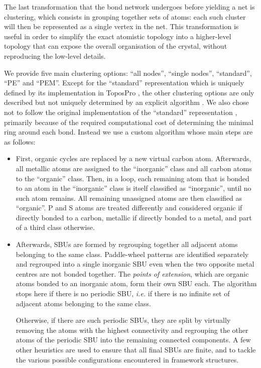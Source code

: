 \documentclass[main.tex]{subfiles}
\begin{document}
The last transformation that the bond network undergoes before yielding a net is clustering, which consists in grouping together sets of atoms: each such cluster will then be represented as a single vertex in the net. This transformation is useful in order to simplify the exact atomistic topology into a higher-level topology that can expose the overall organisation of the crystal, without reproducing the low-level details. %

We provide five main clustering options: ``all nodes'', ``single nodes'', ``standard'', ``PE'' and ``PEM''. Except for the ``standard'' representation which is uniquely defined by its implementation in ToposPro \autocite{BlatovSimplify,BlatovCSD}, the other clustering options are only described but not uniquely determined by an explicit algorithm \autocite{IUPAC_SBU,OKeeffeSBU,OKeeffe,BlatovSimplify,MetalOxo,ProserpioPEM}. We also chose not to follow the original implementation of the ``standard'' representation \autocite{BlatovCSD}, primarily because of the required computational cost of determining the minimal ring around each bond. Instead we use a custom algorithm whose main steps are as follows:
\begin{itemize}
	\item First, organic cycles are replaced by a new virtual carbon atom. Afterwards, all metallic atoms are assigned to the ``inorganic'' class and all carbon atoms to the ``organic'' class. Then, in a loop, each remaining atom that is bonded to an atom in the ``inorganic'' class is itself classified as ``inorganic'', until no such atom remains. All remaining unassigned atoms are then classified as ``organic''. P and S atoms are treated differently and considered organic if directly bonded to a carbon, metallic if directly bonded to a metal, and part of a third class otherwise.
	
	\item Afterwards, SBUs are formed by regrouping together all adjacent atoms belonging to the same class. Paddle-wheel patterns are identified separately and regrouped into a single inorganic SBU even when the two opposite metal centres are not bonded together. The \textit{points of extension}, which are organic atoms bonded to an inorganic atom, form their own SBU each. The algorithm stops here if there is no periodic SBU, \textit{i.e.} if there is no infinite set of adjacent atoms belonging to the same class.
	
	Otherwise, if there are such periodic SBUs, they are split by virtually removing the atoms with the highest connectivity and regrouping the other atoms of the periodic SBU into the remaining connected components. A few other heuristics are used to ensure that all final SBUs are finite, and to tackle the various possible configurations encountered in framework structures.
\end{itemize}
\end{document}
